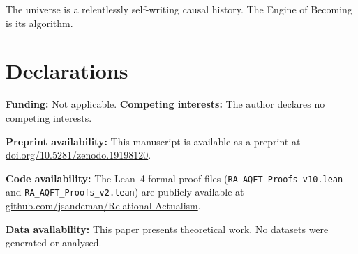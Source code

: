 \documentclass[11pt,a4paper]{article}
\theoremstyle{plain}
\theoremstyle{definition}
\theoremstyle{remark}
\begin{document}
The universe is a relentlessly self-writing causal history.
The Engine of Becoming is its algorithm.


\section*{Declarations}
\textbf{Funding:} Not applicable.\quad
\textbf{Competing interests:} The author declares no competing interests.

\textbf{Preprint availability:} This manuscript is available as a preprint at
\href{https://doi.org/10.5281/zenodo.19198120}{doi.org/10.5281/zenodo.19198120}.

\textbf{Code availability:} The Lean~4 formal proof files
(\texttt{RA\_AQFT\_Proofs\_v10.lean} and \texttt{RA\_AQFT\_Proofs\_v2.lean})
are publicly available at
\href{https://github.com/jsandeman/Relational-Actualism}{github.com/jsandeman/Relational-Actualism}.

\textbf{Data availability:} This paper presents theoretical work. No datasets
were generated or analysed.
\end{document}
